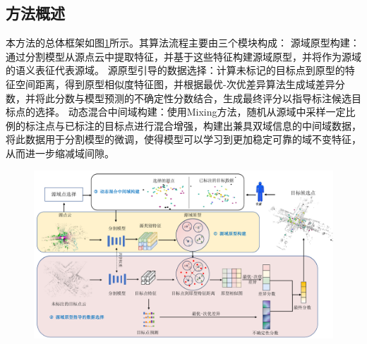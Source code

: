 \subsection{方法概述}
本方法的总体框架如图\ref{fig:framework-3}所示。其算法流程主要由三个模块构成：
源域原型构建：通过分割模型从源点云中提取特征，并基于这些特征构建源域原型，并将作为源域的语义表征代表源域。
源原型引导的数据选择：计算未标记的目标点到原型的特征空间距离，得到原型相似度特征图，并根据最优-次优差异算法生成域差异分数，并将此分数与模型预测的不确定性分数结合，生成最终评分以指导标注候选目标点的选择。
动态混合中间域构建：使用Mixing方法，随机从源域中采样一定比例的标注点与已标注的目标点进行混合增强，构建出兼具双域信息的中间域数据，将此数据用于分割模型的微调，使得模型可以学习到更加稳定可靠的域不变特征，从而进一步缩减域间隙。

\vspace{-0.1cm}
\begin{figure}[h]
    \centering
    \includegraphics[width = \textwidth]{ljx/figure/3-1.pdf}
    \label{fig:framework-3}
\end{figure}
\vspace{-0.35cm}
